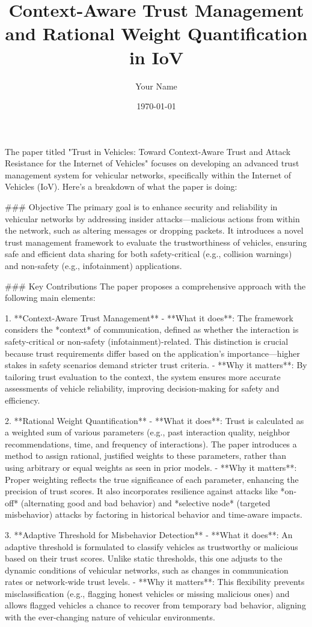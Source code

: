 \documentclass{article}
\title{Context-Aware Trust Management and Rational Weight Quantification in IoV}
\author{Your Name}
\date{\today}
\begin{document}
\maketitle
The paper titled "Trust in Vehicles: Toward Context-Aware Trust and Attack Resistance for the Internet of Vehicles" focuses on developing an advanced trust management system for vehicular networks, specifically within the Internet of Vehicles (IoV). Here’s a breakdown of what the paper is doing:

### Objective
The primary goal is to enhance security and reliability in vehicular networks by addressing insider attacks—malicious actions from within the network, such as altering messages or dropping packets. It introduces a novel trust management framework to evaluate the trustworthiness of vehicles, ensuring safe and efficient data sharing for both safety-critical (e.g., collision warnings) and non-safety (e.g., infotainment) applications.

### Key Contributions
The paper proposes a comprehensive approach with the following main elements:

1. **Context-Aware Trust Management**
   - **What it does**: The framework considers the *context* of communication, defined as whether the interaction is safety-critical or non-safety (infotainment)-related. This distinction is crucial because trust requirements differ based on the application’s importance—higher stakes in safety scenarios demand stricter trust criteria.
   - **Why it matters**: By tailoring trust evaluation to the context, the system ensures more accurate assessments of vehicle reliability, improving decision-making for safety and efficiency.

2. **Rational Weight Quantification**
   - **What it does**: Trust is calculated as a weighted sum of various parameters (e.g., past interaction quality, neighbor recommendations, time, and frequency of interactions). The paper introduces a method to assign rational, justified weights to these parameters, rather than using arbitrary or equal weights as seen in prior models.
   - **Why it matters**: Proper weighting reflects the true significance of each parameter, enhancing the precision of trust scores. It also incorporates resilience against attacks like *on-off* (alternating good and bad behavior) and *selective node* (targeted misbehavior) attacks by factoring in historical behavior and time-aware impacts.

3. **Adaptive Threshold for Misbehavior Detection**
   - **What it does**: An adaptive threshold is formulated to classify vehicles as trustworthy or malicious based on their trust scores. Unlike static thresholds, this one adjusts to the dynamic conditions of vehicular networks, such as changes in communication rates or network-wide trust levels.
   - **Why it matters**: This flexibility prevents misclassification (e.g., flagging honest vehicles or missing malicious ones) and allows flagged vehicles a chance to recover from temporary bad behavior, aligning with the ever-changing nature of vehicular environments.
\end{document}
